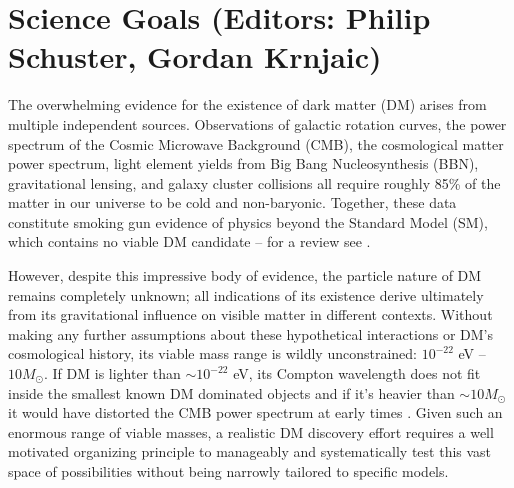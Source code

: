 \section{Science Goals (Editors: Philip Schuster, Gordan Krnjaic)}

The overwhelming evidence for the existence of dark matter (DM) arises from multiple independent sources. 
 Observations of galactic rotation curves, the power spectrum of the Cosmic Microwave Background (CMB), 
the cosmological matter power spectrum, light element yields from Big Bang Nucleosynthesis (BBN), gravitational
lensing, and galaxy cluster collisions all require roughly 85\% of the matter in our universe to be cold and non-baryonic. 
Together, these data constitute smoking gun evidence  of physics beyond the Standard Model (SM), which contains
no viable DM candidate -- for a review see \cite{Bertone:2004pz}.

However, despite this impressive body of evidence, the particle nature of DM remains completely unknown; all indications of 
its existence derive ultimately from its gravitational influence on visible matter in different contexts. 
Without making any further assumptions about these hypothetical interactions or DM's cosmological history,
 its viable mass range is wildly unconstrained: $10^{-22} $ eV -- $10 M_{\odot}$.  If DM is lighter than $\sim 10^{-22}$ eV, 
 its Compton wavelength does not fit inside the smallest known DM dominated objects \cite{Navarro:1995iw} and if it's heavier than $\sim 10 M_{\odot}$ 
 it would have distorted the CMB power spectrum at early times \cite{Bird:2016dcv}. Given such an enormous range of viable masses, a realistic DM discovery effort requires a well motivated organizing principle to manageably and systematically test this vast space of possibilities without being narrowly tailored
 to specific models.

